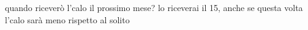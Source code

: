 quando riceverò l'calo il prossimo mese?
lo riceverai il 15, anche se questa volta l'calo sarà meno rispetto al solito
